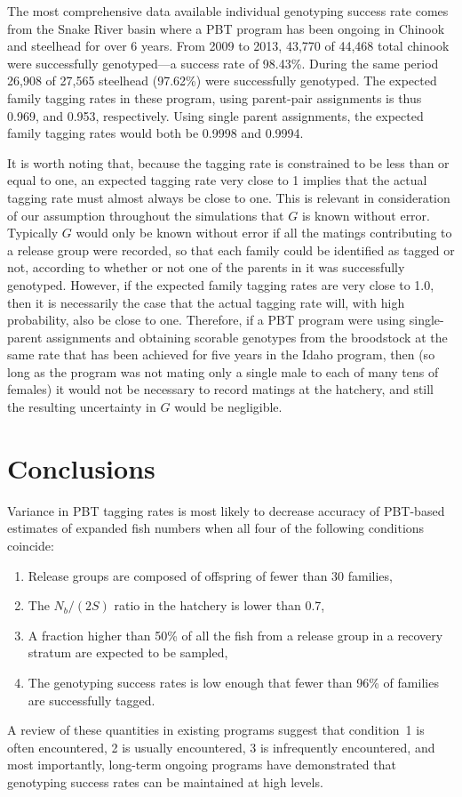 \documentclass[11pt]{article}
\begin{document}
The most comprehensive data available individual genotyping success rate comes from the Snake River basin where a PBT program has been 
ongoing in Chinook and steelhead for over 6 years.  From 2009 to 2013, 43,770 of 44,468 total chinook were successfully genotyped---a success
rate of 98.43\%.  During the same period 26,908 of 27,565 steelhead (97.62\%) were successfully genotyped.  The expected family tagging
rates in these program, using parent-pair assignments is thus 0.969, and 0.953, respectively.  Using single parent assignments, 
the expected family tagging rates would both be 0.9998 and 0.9994.  

It is worth noting that, because the tagging rate is constrained to be less than or equal to one, an expected tagging rate very 
close to 1 implies that the actual tagging rate must almost always be close to one.  
This is relevant in consideration of our assumption
throughout the simulations that $G$ is known without error. Typically $G$ would only be known without error if all the
matings contributing to a release group were recorded, so that each family could be identified as tagged or not, according to
whether or not one of the parents in it was successfully genotyped.
However, if the expected family tagging rates are very close to 1.0, then it is necessarily the case that
the actual tagging rate will, with high probability, also be 
close to one. Therefore, if a PBT program were using single-parent assignments and
obtaining scorable genotypes from the
broodstock at the same rate that has been achieved for five years in the Idaho program, then
(so long as the program was not mating only a single male to each of many tens of females) it would not be necessary
to record matings at the hatchery, and still the
resulting uncertainty in $G$ would be negligible.



\section{Conclusions}

Variance in PBT tagging rates is most likely to decrease accuracy of PBT-based estimates of expanded fish numbers
when all four of the following conditions coincide:
\begin{enumerate}
\item Release groups are composed of offspring of fewer than 30 families,
\item The $N_b/(2S)$ ratio in the hatchery is lower than 0.7,
\item A fraction higher than 50\% of all the fish from a release group in a recovery stratum are expected to be sampled,
\item The genotyping success rates is low enough that fewer than 96\% of families are successfully tagged.
\end{enumerate}
A review of these quantities in existing programs suggest that condition~1 is often encountered, 2 is usually encountered, 3 is infrequently 
encountered, and most importantly, long-term ongoing programs have demonstrated that genotyping success rates can be maintained 
at high levels.
\end{document}
